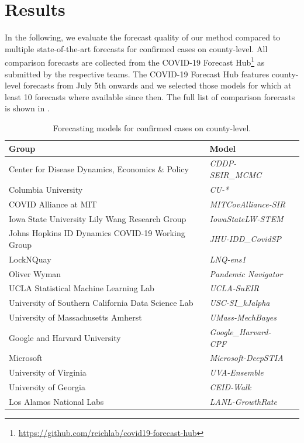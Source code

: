 
\section{Results}
\label{sec:org99c3fc8}
In the following, we evaluate the forecast quality of our method compared to
multiple state-of-the-art forecasts for confirmed cases on
county-level. All comparison forecasts are collected from the COVID-19 Forecast
Hub\footnote{\url{https://github.com/reichlab/covid19-forecast-hub}} as submitted by
the respective teams. The COVID-19 Forecast Hub features county-level forecasts
from July 5th onwards and we selected those models for which at least 10 forecasts
where available since then. The full list of comparison forecasts is shown in
.

\begin{table}[t]
\small
\caption{Forecasting models for confirmed cases on county-level.\label{tab:forecasts}}
\centering
\begin{tabular}{lll}
\toprule
\bf Group & \bf Model \\
\midrule
Center for Disease Dynamics, Economics \& Policy & \it CDDP-SEIR\_MCMC & \citep{cddep_seir_mcmc} \\
Columbia University & \it CU-* & \citep{forecasts/columbia} \\
COVID Alliance at MIT & \it MITCovAlliance-SIR & \citep{baek2020limits} \\
Iowa State University Lily Wang Research Group & \it IowaStateLW-STEM & \citep{wang2020spatiotemporal} \\
Johns Hopkins ID Dynamics COVID-19 Working Group & \it JHU-IDD\_CovidSP & \citep{forecasts/jhu_idd_covidsp} \\
LockNQuay & \it LNQ-ens1 & \citep{forecasts/lnq_ens1} \\
Oliver Wyman & \it Pandemic Navigator & \citep{forecasts/oliver_wyman} \\
UCLA Statistical Machine Learning Lab & \it UCLA-SuEIR & \citep{forecasts/Zou2020.05.24.20111989} \\
University of Southern California Data Science Lab & \it USC-SI\_kJalpha & \citep{srivastava2020fast} \\
University of Massachusetts Amherst & \it UMass-MechBayes & \citep{forecasts/umass_mechbayes} \\
Google and Harvard University & \it Google\_Harvard-CPF & \citep{forecasts/google} \\
Microsoft & \it Microsoft-DeepSTIA & \citep{forecasts/microsoft} \\
University of Virginia & \it UVA-Ensemble & \citep{forecasts/uva} \\
University of Georgia & \it CEID-Walk & \citep{forecasts/ceid} \\
Los Alamos National Labs & \it LANL-GrowthRate & \citep{forecasts/lanl} \\
\bottomrule
\end{tabular}
\end{table}

